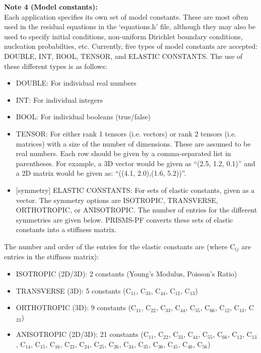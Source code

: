 \documentclass[10pt]{article} %
\begin{document}
\textbf{Note 4 (Model constants):} \\
Each application specifies its own set of model constants. These are most often used in the residual equations in the `equations.h' file, although they may also be used to specify initial conditions, non-uniform Dirichlet boundary conditions, nucleation probabilties, etc. Currently, five types of model constants are accepted: DOUBLE, INT, BOOL, TENSOR, and ELASTIC CONSTANTS. The use of these different types is as follows:
\begin{itemize}
\item DOUBLE: For individual real numbers
\item INT: For individual integers
\item BOOL: For individual booleans (true/false)
\item TENSOR: For either rank 1 tensors (i.e. vectors) or rank 2 tensors (i.e. matrices) with a size of the number of dimensions. These are assumed to be real numbers. Each row should be given by a comma-separated list in parentheses. For example, a 3D vector would be given as ``(2.5, 1.2, 0.1)'' and a 2D matrix would be given as: ``((4.1, 2.0),(1.6, 5.2))''.
\item {[symmetry]} ELASTIC CONSTANTS: For sets of elastic constants, given as a vector. The symmetry options are ISOTROPIC, TRANSVERSE, ORTHOTROPIC, or ANISOTROPIC. The number of entries for the different symmetries are given below. PRISMS-PF converts these sets of elastic constants into a stiffness matrix.
\end{itemize}

The number and order of the entries for the elastic constants are (where C$_{ij}$ are entries in the stiffness matrix):
\begin{itemize}
\item ISOTROPIC (2D/3D): 2 constants (Young's Modulus, Poisson's Ratio)
\item TRANSVERSE (3D): 5 constants (C$_{11}$, C$_{33}$, C$_{44}$, C$_{12}$, C$_{13}$)
\item ORTHOTROPIC (3D): 9 constants (C$_{11}$, C$_{22}$, C$_{33}$, C$_{44}$, C$_{55}$, C$_{66}$, C$_{12}$, C$_{13}$, C$_{23}$)
\item ANISOTROPIC (2D/3D): 21 constants (C$_{11}$, C$_{22}$, C$_{33}$, C$_{44}$, C$_{55}$, C$_{66}$, C$_{12}$, C$_{13}$, C$_{14}$, C$_{15}$, C$_{16}$, C$_{23}$, C$_{24}$, C$_{25}$, C$_{26}$, C$_{34}$, C$_{35}$, C$_{36}$, C$_{45}$, C$_{46}$, C$_{56}$)
\end{itemize}
\end{document}
